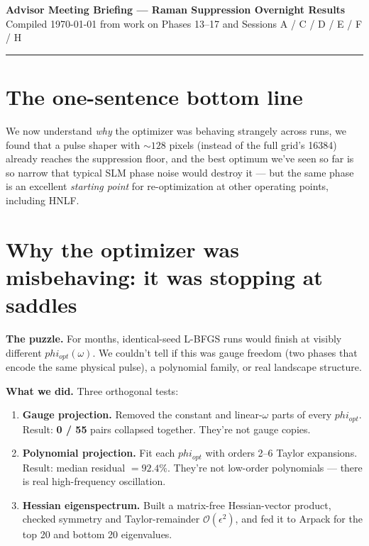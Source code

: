 \documentclass[11pt,letterpaper]{article}
\def\varphi{phi}\def\lambda{lambda}\def\mathrm#1{#1}%
\begin{document}
\begin{center}
{\large\bfseries Advisor Meeting Briefing --- Raman Suppression Overnight Results}\\[2pt]
{\small Compiled \today{} from work on Phases 13--17 and Sessions A / C / D / E / F / H}
\end{center}

\vspace{-0.5em}
\rule{\linewidth}{0.4pt}

\section*{The one-sentence bottom line}

We now understand \emph{why} the optimizer was behaving strangely across runs, we found that a pulse shaper with $\sim 128$ pixels (instead of the full grid's 16384) already reaches the suppression floor, and the best optimum we've seen so far is so narrow that typical SLM phase noise would destroy it --- but the same phase is an excellent \emph{starting point} for re-optimization at other operating points, including HNLF.

\section{Why the optimizer was misbehaving: it was stopping at saddles}

\textbf{The puzzle.} For months, identical-seed L-BFGS runs would finish at visibly different $\varphi_{\mathrm{opt}}(\omega)$. We couldn't tell if this was gauge freedom (two phases that encode the same physical pulse), a polynomial family, or real landscape structure.

\textbf{What we did.} Three orthogonal tests:
\begin{enumerate}[leftmargin=*]
  \item \textbf{Gauge projection.} Removed the constant and linear-$\omega$ parts of every $\varphi_{\mathrm{opt}}$. Result: \textbf{0 / 55} pairs collapsed together. They're not gauge copies.
  \item \textbf{Polynomial projection.} Fit each $\varphi_{\mathrm{opt}}$ with orders 2--6 Taylor expansions. Result: median residual $= 92.4\%$. They're not low-order polynomials --- there is real high-frequency oscillation.
  \item \textbf{Hessian eigenspectrum.} Built a matrix-free Hessian-vector product, checked symmetry and Taylor-remainder $\mathcal{O}(\epsilon^2)$, and fed it to Arpack for the top 20 and bottom 20 eigenvalues.
\end{enumerate}
\end{document}
